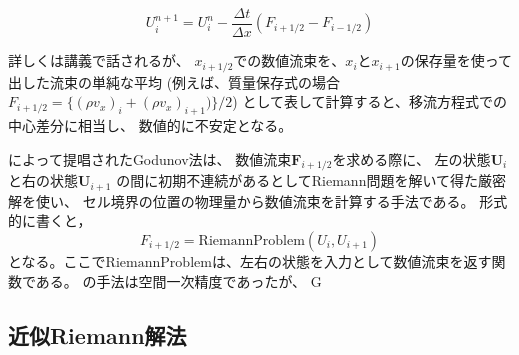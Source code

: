 \begin{screen}
\begin{equation}
    U_i^{n+1} = U_i^n - \frac{\Delta t}{\Delta x} \left( F_{i+1/2} - F_{i-1/2} \right)
\end{equation}
\end{screen}

詳しくは講義で話されるが、
$x_{i+1/2}$での数値流束を、$x_i$と$x_{i+1}$の保存量を使って
出した流束の単純な平均
(例えば、質量保存式の場合
$F_{i+1/2}=\{ (\rho v_x)_i + (\rho v_x)_{i+1})\}/2$)
として表して計算すると、移流方程式での中心差分に相当し、
数値的に不安定となる。


\citet{Godunov1959}によって提唱されたGodunov法は、
数値流束$\bm{ F}_{i+1/2}$を求める際に、
左の状態$\bm{ U}_i$と右の状態$\bm{ U}_{i+1}$
の間に初期不連続があるとしてRiemann問題を解いて得た厳密解を使い、
セル境界の位置の物理量から数値流束を計算する手法である。
形式的に書くと，
\begin{equation}
    F_{i+1/2} = \mathrm{RiemannProblem}(U_{i},U_{i+1})
\end{equation}
となる。ここで$\mathrm{RiemannProblem}$は、左右の状態を入力として数値流束を返す関数である。
\citet{Godunov1959}の手法は空間一次精度であったが、
G



\clearpage
\subsection{近似Riemann解法}

